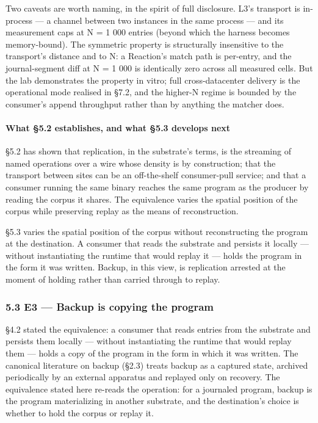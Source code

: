 \documentclass[
]{article}
\begin{document}
Two caveats are worth naming, in the spirit of full disclosure. L3's
transport is in-process --- a channel between two instances in the same
process --- and its measurement caps at N = 1 000 entries (beyond which
the harness becomes memory-bound). The symmetric property is
structurally insensitive to the transport's distance and to N: a
Reaction's match path is per-entry, and the journal-segment diff at N =
1 000 is identically zero across all measured cells. But the lab
demonstrates the property in vitro; full cross-datacenter delivery is
the operational mode realised in §7.2, and the higher-N regime is
bounded by the consumer's append throughput rather than by anything the
matcher does.

\paragraph{What §5.2 establishes, and what §5.3 develops
next}\label{what-5.2-establishes-and-what-5.3-develops-next}

§5.2 has shown that replication, in the substrate's terms, is the
streaming of named operations over a wire whose density is by
construction; that the transport between sites can be an off-the-shelf
consumer-pull service; and that a consumer running the same binary
reaches the same program as the producer by reading the corpus it
shares. The equivalence varies the spatial position of the corpus while
preserving replay as the means of reconstruction.

§5.3 varies the spatial position of the corpus without reconstructing
the program at the destination. A consumer that reads the substrate and
persists it locally --- without instantiating the runtime that would
replay it --- holds the program in the form it was written. Backup, in
this view, is replication arrested at the moment of holding rather than
carried through to replay.

\subsubsection{5.3 E3 --- Backup is copying the
program}\label{e3-backup-is-copying-the-program}

§4.2 stated the equivalence: a consumer that reads entries from the
substrate and persists them locally --- without instantiating the
runtime that would replay them --- holds a copy of the program in the
form in which it was written. The canonical literature on backup (§2.3)
treats backup as a captured state, archived periodically by an external
apparatus and replayed only on recovery. The equivalence stated here
re-reads the operation: for a journaled program, backup is the program
materializing in another substrate, and the destination's choice is
whether to hold the corpus or replay it.
\end{document}
